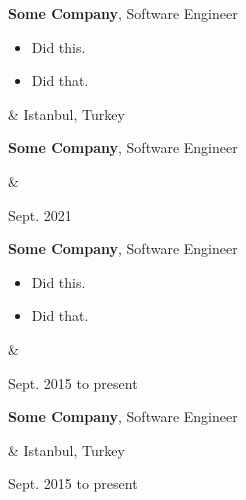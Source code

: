 \documentclass[10pt, letterpaper]{article}
\newenvironment{highlights}{
        \begin{itemize}[
                topsep=0pt,
                parsep=0.10 cm,
                partopsep=0pt,
                itemsep=0pt,
                after=\vspace{-1\baselineskip},
                leftmargin=0.4 cm + 3pt
            ]
    }{
        \end{itemize}
    } %
\let\originalTabularx\tabularx
\let\originalEndTabularx\endtabularx
\renewenvironment{tabularx}{\bgroup\centering\originalTabularx}{\originalEndTabularx\par\egroup}
\begin{document}
        \vspace{0.2 cm}
        \begin{tabularx}{
            \textwidth-0.4 cm-0.13cm
        }{
            K{0.2 cm}
            R{4.1 cm}
        }
            \textbf{Some Company}, Software Engineer

            \vspace{0.10 cm}

            \begin{highlights}
                \item Did this.
                \item Did that.
            \end{highlights}
            &
            Istanbul, Turkey

            
        \end{tabularx}

        \vspace{0.2 cm}
        \begin{tabularx}{
            \textwidth-0.4 cm-0.13cm
        }{
            K{0.2 cm}
            R{4.1 cm}
        }
            \textbf{Some Company}, Software Engineer

            \vspace{0.10 cm}

            &
            

            Sept. 2021
        \end{tabularx}

        \vspace{0.2 cm}
        \begin{tabularx}{
            \textwidth-0.4 cm-0.13cm
        }{
            K{0.2 cm}
            R{4.1 cm}
        }
            \textbf{Some Company}, Software Engineer

            \vspace{0.10 cm}

            \begin{highlights}
                \item Did this.
                \item Did that.
            \end{highlights}
            &
            

            Sept. 2015 to present
        \end{tabularx}

        \vspace{0.2 cm}
        \begin{tabularx}{
            \textwidth-0.4 cm-0.13cm
        }{
            K{0.2 cm}
            R{4.1 cm}
        }
            \textbf{Some Company}, Software Engineer

            \vspace{0.10 cm}

            &
            Istanbul, Turkey

            Sept. 2015 to present
        \end{tabularx}
\end{document}
